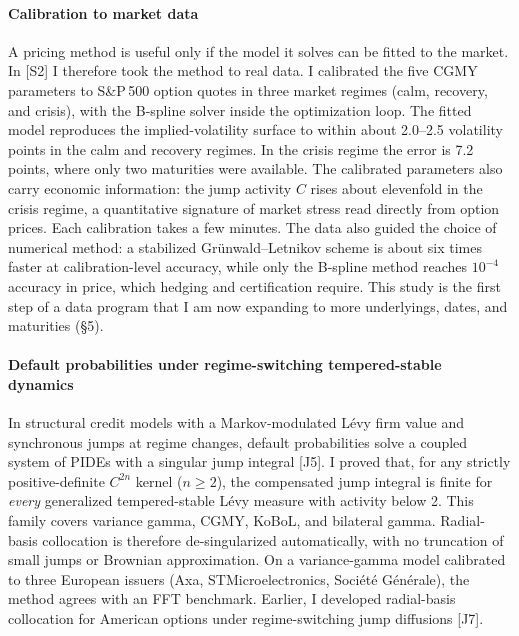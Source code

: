 \documentclass[11pt]{article}
\newcommand{\rc}[1]{\textcolor{accent}{[#1]}}
\begin{document}
\paragraph{Calibration to market data}
A pricing method is useful only if the model it solves can be fitted to
the market. In \rc{S2} I therefore took the method to real data. I
calibrated the five CGMY parameters to S\&P\,500 option quotes in three
market regimes (calm, recovery, and crisis), with the
B-spline solver inside the optimization loop. %
The fitted model reproduces the implied-volatility surface to within about
2.0--2.5 volatility points in the calm and recovery regimes. In the crisis
regime the error is 7.2 points, where only two maturities were available.
The calibrated parameters also carry economic information: the jump
activity $C$ rises about elevenfold in the crisis regime, a quantitative
signature of market stress read directly from option prices. Each
calibration takes a few minutes. The data also guided the choice of
numerical method: a stabilized Gr\"unwald--Letnikov scheme is about six
times faster at calibration-level accuracy, while only the B-spline method
reaches $10^{-4}$ accuracy in price, which hedging and certification
require. This study is the first step of a data program that I am now
expanding to more underlyings, dates, and maturities (\S5).

\paragraph{Default probabilities under regime-switching tempered-stable dynamics}
In structural credit models with a Markov-modulated L\'evy firm value and
synchronous jumps at regime changes, default probabilities solve a coupled
system of PIDEs with a singular jump integral \rc{J5}. I proved that, for
any strictly positive-definite $C^{2n}$ kernel ($n\ge2$), the compensated
jump integral is finite for \emph{every} generalized tempered-stable L\'evy
measure with activity below 2. This family covers variance gamma, CGMY,
KoBoL, and bilateral gamma. Radial-basis collocation is therefore
de-singularized automatically, with no truncation of small jumps or
Brownian approximation. On a variance-gamma model calibrated to three
European issuers (Axa, STMicroelectronics, Soci\'et\'e G\'en\'erale), the
method agrees with an FFT benchmark. Earlier, I developed radial-basis
collocation for American options under regime-switching jump diffusions
\rc{J7}.

\end{document}
